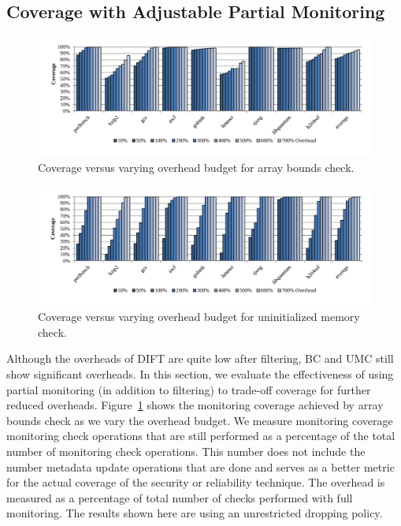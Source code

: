 \subsection{Coverage with Adjustable Partial Monitoring}

\begin{figure}
  \begin{center}
    \includegraphics[width=\linewidth]{figs/data_bc_sweep.pdf}
    \vspace{-0.4in}
    \caption{Coverage versus varying overhead budget for array bounds check.}
    \label{fig:evaluation.bc_sweep}
    \vspace{-0.2in}
  \end{center}
\end{figure}

\begin{figure}
  \begin{center}
    \includegraphics[width=\linewidth]{figs/data_umc_sweep.pdf}
    \vspace{-0.4in}
    \caption{Coverage versus varying overhead budget for uninitialized memory check.}
    \label{fig:evaluation.umc_sweep}
    \vspace{-0.1in}
  \end{center}
\end{figure}

Although the overheads of DIFT are quite low after filtering, BC and UMC still
show significant overheads. In this section, we evaluate the effectiveness of
using partial monitoring (in addition to filtering) to trade-off coverage for further reduced overheads.
Figure~\ref{fig:evaluation.bc_sweep} shows the monitoring coverage achieved by
array bounds check as we vary the overhead budget. We measure monitoring
coverage monitoring check operations that are still performed as a percentage
of the total number of monitoring check operations. This number does not
include the number metadata update operations that are done and serves as a
better metric for the actual coverage of the security or reliability technique.
The overhead is measured as a percentage of total number of checks performed
with full monitoring. The results shown here are using an unrestricted dropping
policy.

